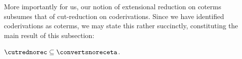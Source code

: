 More importantly for us, our notion of extensional reduction on coterms subsumes that of cut-reduction on coderivations.
Since we have identified coderivations as coterms, we may state this rather succinctly, constituting the main result of this subsection:
\begin{theorem}
\label{thm:reduction-inludes-cut-elimination}
${\cutrednorec}\subseteq {\convertsnoreceta}$.
\end{theorem}
